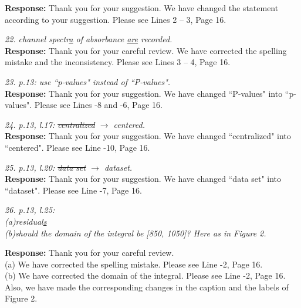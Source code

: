 \documentclass[12pt]{report}
\begin{document}
\begin{description}
{ \bf Response: } Thank you for your suggestion.  We have changed the statement according to your suggestion. Please see Lines 2 -- 3, Page 16.\\

\item {{ \textcolor[rgb]{0.00,0.50,1.00}{\em 22.  channel spectr\uline{a} of absorbance \uline{are} recorded.
}}}\\

{ \bf Response: } Thank you for your careful review. We have corrected the spelling mistake and the inconsistency.
Please see Lines 3 -- 4, Page 16.

\item {{ \textcolor[rgb]{0.00,0.50,1.00}{\em 23.  p.13: use ``p-values" instead of ``P-values".
}}}\\

{ \bf Response: } Thank you for your suggestion. We have changed ``P-values" into ``p-values". Please see Lines -8 and -6, Page 16.\\

\item {{ \textcolor[rgb]{0.00,0.50,1.00}{\em 24.  p.13, l.17: \sout{centralized} $\rightarrow$ centered.
}}}\\

{ \bf Response: } Thank you for your suggestion. We have changed ``centralized" into ``centered". Please see Line -10, Page 16.\\

\item {{ \textcolor[rgb]{0.00,0.50,1.00}{\em 25.  p.13, l.20: \sout{data set} $\rightarrow$ dataset.
}}}\\

{ \bf Response: } Thank you for your suggestion. We have changed ``data set" into ``dataset". Please see Line -7, Page 16.\\

\item {{ \textcolor[rgb]{0.00,0.50,1.00}{\em 26.  p.13, l.25:\\
(a)residual\uline{s}\\
(b)should the domain of the integral be [850, 1050]? Here as in Figure 2.
}}}

{ \bf Response: } Thank you for your careful review.\\

(a) We have corrected the spelling mistake. Please see Line -2, Page 16.\\

(b)  We have corrected the domain of the integral. Please see Line -2, Page 16. Also, we have made the corresponding changes in the caption and the labels of Figure 2.\\



\end{description}
\end{document}
